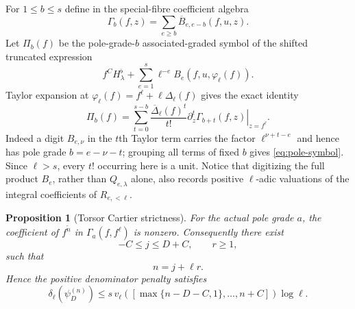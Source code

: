 \documentclass[11pt]{article}
\newtheorem{proposition}[proposition]{Proposition}
\theoremstyle{definition}
\theoremstyle{remark}
\begin{document}
For $1\le b\le s$ define in the special-fibre coefficient algebra
\begin{equation}\label{eq:Gamma-pole-grade}
 \Gamma_b(f,z)=
 \sum_{e\ge b}\overline B_{e,e-b}(f,u,z).
\end{equation}
Let $\Pi_b(f)$ be the pole-grade-$b$ associated-graded symbol of the shifted
truncated expression
\[
 f^CH_\lambda^\flat+
 \sum_{e=1}^s\ell^{-e}B_e(f,u,\varphi_\ell(f)).
\]
Taylor expansion at
$\varphi_\ell(f)=f^\ell+\ell\Delta_\ell(f)$ gives the exact identity
\begin{equation}\label{eq:pole-symbol}
 \boxed{
 \Pi_b(f)=\sum_{t=0}^{s-b}
 \frac{\overline\Delta_\ell(f)^t}{t!}
 \left.\partial_z^t\Gamma_{b+t}(f,z)\right|_{z=f^\ell}.}
\end{equation}
Indeed a digit $B_{e,\nu}$ in the $t$th Taylor term carries the factor
$\ell^{\nu+t-e}$ and hence has pole grade $b=e-\nu-t$; grouping all terms of
fixed $b$ gives \eqref{eq:pole-symbol}.  Since $\ell>s$, every $t!$ occurring
here is a unit.  Notice that digitizing the full product $B_e$, rather than
$Q_{e,\lambda}$ alone, also records positive $\ell$-adic valuations of the
integral coefficients of $R_{e,<\ell}$.

\begin{proposition}[Torsor Cartier strictness]\label{prop:Cartier}
For the actual pole grade $a$, the coefficient of $f^{\widetilde n}$ in
$\Gamma_a(f,f^\ell)$ is nonzero.  Consequently there exist
\[
 -C\le j\le D+C,
 \qquad r\ge1,
\]
such that
\begin{equation}\label{eq:njr}
 n=j+\ell r.
\end{equation}
Hence the positive denominator penalty satisfies
\begin{equation}\label{eq:large-local-height}
 \delta_\ell(\psi_D^{(n)})
 \le s\,v_\ell
 \left([\max\{n-D-C,1\},\ldots,n+C]\right)\log\ell.
\end{equation}
\end{proposition}
\end{document}
